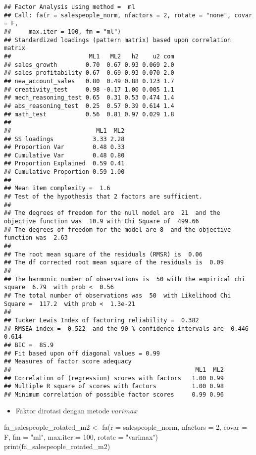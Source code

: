 \documentclass[
]{article}
\newenvironment{Shaded}{\begin{snugshade}}{\end{snugshade}}
\newcommand{\AttributeTok}[1]{\textcolor[rgb]{0.77,0.63,0.00}{#1}}
\newcommand{\DecValTok}[1]{\textcolor[rgb]{0.00,0.00,0.81}{#1}}
\newcommand{\FunctionTok}[1]{\textcolor[rgb]{0.00,0.00,0.00}{#1}}
\newcommand{\NormalTok}[1]{#1}
\newcommand{\OtherTok}[1]{\textcolor[rgb]{0.56,0.35,0.01}{#1}}
\newcommand{\StringTok}[1]{\textcolor[rgb]{0.31,0.60,0.02}{#1}}
\providecommand{\tightlist}{%
  \setlength{\itemsep}{0pt}\setlength{\parskip}{0pt}}
\begin{document}
\begin{verbatim}
## Factor Analysis using method =  ml
## Call: fa(r = salespeople_norm, nfactors = 2, rotate = "none", covar = F, 
##     max.iter = 100, fm = "ml")
## Standardized loadings (pattern matrix) based upon correlation matrix
##                      ML1   ML2   h2    u2 com
## sales_growth        0.70  0.67 0.93 0.069 2.0
## sales_profitability 0.67  0.69 0.93 0.070 2.0
## new_account_sales   0.80  0.49 0.88 0.123 1.7
## creativity_test     0.98 -0.17 1.00 0.005 1.1
## mech_reasoning_test 0.65  0.31 0.53 0.474 1.4
## abs_reasoning_test  0.25  0.57 0.39 0.614 1.4
## math_test           0.56  0.81 0.97 0.029 1.8
## 
##                        ML1  ML2
## SS loadings           3.33 2.28
## Proportion Var        0.48 0.33
## Cumulative Var        0.48 0.80
## Proportion Explained  0.59 0.41
## Cumulative Proportion 0.59 1.00
## 
## Mean item complexity =  1.6
## Test of the hypothesis that 2 factors are sufficient.
## 
## The degrees of freedom for the null model are  21  and the objective function was  10.9 with Chi Square of  499.66
## The degrees of freedom for the model are 8  and the objective function was  2.63 
## 
## The root mean square of the residuals (RMSR) is  0.06 
## The df corrected root mean square of the residuals is  0.09 
## 
## The harmonic number of observations is  50 with the empirical chi square  6.79  with prob <  0.56 
## The total number of observations was  50  with Likelihood Chi Square =  117.2  with prob <  1.3e-21 
## 
## Tucker Lewis Index of factoring reliability =  0.382
## RMSEA index =  0.522  and the 90 % confidence intervals are  0.446 0.614
## BIC =  85.9
## Fit based upon off diagonal values = 0.99
## Measures of factor score adequacy             
##                                                    ML1  ML2
## Correlation of (regression) scores with factors   1.00 0.99
## Multiple R square of scores with factors          1.00 0.98
## Minimum correlation of possible factor scores     0.99 0.96
\end{verbatim}

\begin{itemize}
\tightlist
\item
  Faktor dirotasi dengan metode \(varimax\)
\end{itemize}

\begin{Shaded}
\begin{Highlighting}[]
\NormalTok{fa\_salespeople\_rotated\_m2 }\OtherTok{\textless{}{-}} \FunctionTok{fa}\NormalTok{(}\AttributeTok{r =}\NormalTok{ salespeople\_norm, }\AttributeTok{nfactors =} \DecValTok{2}\NormalTok{, }\AttributeTok{covar =}\NormalTok{ F, }\AttributeTok{fm =} \StringTok{"ml"}\NormalTok{, }\AttributeTok{max.iter =} \DecValTok{100}\NormalTok{, }\AttributeTok{rotate =} \StringTok{"varimax"}\NormalTok{)}
\FunctionTok{print}\NormalTok{(fa\_salespeople\_rotated\_m2)}
\end{Highlighting}
\end{Shaded}
\end{document}
